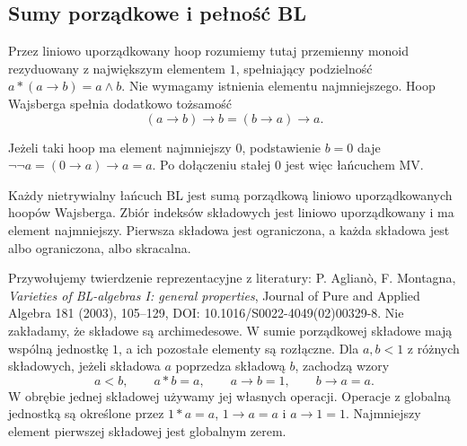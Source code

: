 \subsection{Sumy porządkowe i pełność BL}
\begin{definicja}\label{def:lst-fuzzy-wajsberg-hoop}
Przez liniowo uporządkowany hoop rozumiemy tutaj przemienny
monoid rezyduowany z największym elementem $1$, spełniający
podzielność $a*(a\to b)=a\wedge b$. Nie wymagamy
istnienia elementu najmniejszego. Hoop Wajsberga
spełnia dodatkowo tożsamość
\[
 (a\to b)\to b=(b\to a)\to a.
\]
\end{definicja}
Jeżeli taki hoop ma element najmniejszy $0$, podstawienie
$b=0$ daje $\neg\neg a=(0\to a)\to a=a$.
Po dołączeniu stałej $0$ jest więc łańcuchem MV.

\begin{twierdzenie}
\label{thm:lst-fuzzy-bl-ordinal-decomposition}
Każdy nietrywialny łańcuch BL jest sumą porządkową
liniowo uporządkowanych hoopów Wajsberga. Zbiór indeksów
składowych jest liniowo uporządkowany i ma element
najmniejszy. Pierwsza składowa jest ograniczona,
a każda składowa jest albo ograniczona, albo skracalna.
\end{twierdzenie}
Przywołujemy twierdzenie reprezentacyjne z literatury:
P. Aglianò, F. Montagna, \emph{Varieties of BL-algebras I:
general properties}, Journal of Pure and Applied Algebra
181 (2003), 105--129, DOI: 10.1016/S0022-4049(02)00329-8.
Nie zakładamy, że składowe są archimedesowe.
W sumie porządkowej składowe mają wspólną jednostkę
$1$, a ich pozostałe elementy są rozłączne.
Dla $a,b<1$ z różnych składowych, jeżeli składowa $a$
poprzedza składową $b$, zachodzą wzory
\[
 a<b,\qquad a*b=a,\qquad a\to b=1,\qquad b\to a=a.
\]
W obrębie jednej składowej używamy jej własnych operacji.
Operacje z globalną jednostką są określone przez
$1*a=a$, $1\to a=a$ i $a\to1=1$.
Najmniejszy element pierwszej składowej jest globalnym zerem.

